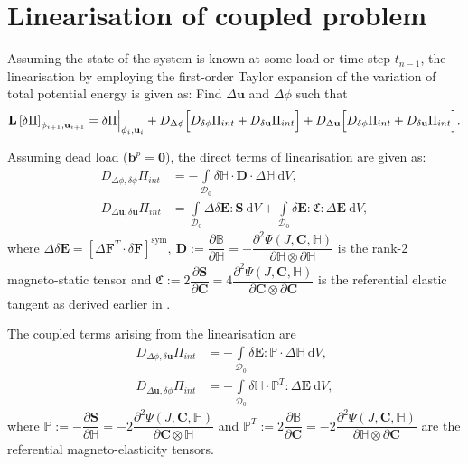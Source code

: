 \documentclass[11pt,a4paper,final]{article}
\begin{document}
\section{Linearisation of coupled problem}
Assuming the state of the system is known at some load or time step $t_{n-1}$, the linearisation by employing the first-order Taylor expansion of the variation of total potential energy is given as: Find $\Delta \mathbf{u}$ and $\Delta \phi$ such that
\begin{equation}
\mathbf{L} \left[ \delta \Pi \right]_{\phi_{i+1}, \mathbf{u}_{i+1}} = \delta \Pi \Big{|}_{\phi_i, \mathbf{u}_i} + D_{\Delta \phi} \Big[ D_{\delta \phi} \Pi_{int} + D_{\delta \mathbf{u}} \Pi_{int} \Big] + D_{\Delta \mathbf{u}} \Big[ D_{\delta \phi} \Pi_{int} + D_{\delta \mathbf{u}} \Pi_{int} \Big].
\label{eq:3.29}
\end{equation} 

Assuming dead load ($\mathbf{b}^p = \mathbf{0}$), the direct terms of linearisation are given as:
\begin{align}
D_{\Delta \phi, \delta \phi} \Pi_{int} &= - \int\limits_{\mathcal{D}_0} \delta \mathbb{H} \cdot \mathbf{D} \cdot \Delta \mathbb{H} \ \mathrm{d}V, \label{eq:3.30.1}\\
D_{\Delta \mathbf{u}, \delta \mathbf{u}} \Pi_{int} &= \int\limits_{\mathcal{D}_0} \Delta \delta \mathbf{E} : \mathbf{S} \ \mathrm{d}V + \int\limits_{\mathcal{D}_0} \delta \mathbf{E} : \mathfrak{C} : \Delta \mathbf{E} \ \mathrm{d}V, \label{eq:2.30.2}
\end{align}
where $\Delta \delta \mathbf{E} = \left[ \Delta \mathbf{F}^T \cdot \delta \mathbf{F} \right]^{\text{sym}}, \ \mathbf{D} := \dfrac{\partial \mathbb{B}}{\partial \mathbb{H}} = -\dfrac{\partial^2 \Psi (J, \mathbf{C}, \mathbb{H})}{\partial \mathbb{H} \otimes \partial \mathbb{H}}$ is the rank-2 magneto-static tensor and $\mathfrak{C} := 2\dfrac{\partial \mathbf{S}}{\partial \mathbf{C}} = 4\dfrac{\partial^2 \Psi (J, \mathbf{C}, \mathbb{H})}{\partial \mathbf{C} \otimes \partial \mathbf{C}}$ is the referential elastic tangent as derived earlier in . \par 

The coupled terms arising from the linearisation are
\begin{align}
D_{\Delta \phi, \delta \mathbf{u}} \Pi_{int} &= - \int\limits_{\mathcal{D}_0} \delta \mathbf{E} : \mathbb{P} \cdot \Delta \mathbb{H} \ \mathrm{d}V, \label{eq:3.31.1} \\
D_{\Delta \mathbf{u}, \delta \phi} \Pi_{int} &= - \int\limits_{\mathcal{D}_0} \delta \mathbb{H} \cdot \mathbb{P}^T : \Delta \mathbf{E} \ \mathrm{d}V, \label{eq:3.31.2}
\end{align}
where $\mathbb{P} := -\dfrac{\partial \mathbf{S}}{\partial \mathbb{H}} = -2 \dfrac{\partial^2 \Psi (J, \mathbf{C}, \mathbb{H})}{\partial \mathbf{C} \otimes \mathbb{H}}$ and $\mathbb{P}^T := 2 \dfrac{\partial \mathbb{B}}{\partial \mathbf{C}} = -2 \dfrac{\partial^2 \Psi (J, \mathbf{C}, \mathbb{H})}{\partial \mathbb{H} \otimes \partial \mathbf{C}}$ are the referential magneto-elasticity tensors. \par 
\end{document}

